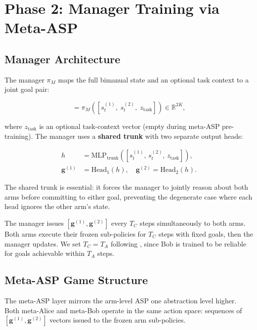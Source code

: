 \documentclass[12pt, a4paper]{article}
\newcommand{\piM}{\pi_M}
\newcommand{\goalvec}{\mathbf{g}}
\newcommand{\RR}{\mathbb{R}}
\begin{document}
\section{Phase 2: Manager Training via Meta-ASP}
\label{sec:phase2}

\subsection{Manager Architecture}
\label{subsec:manager_arch}

The manager $\piM$ maps the full bimanual state and an optional task context to a joint
goal pair:

\begin{equation}
    [\goalvec^{(1)}, \goalvec^{(2)}] = \piM\!\left([s_t^{(1)},\; s_t^{(2)},\; z_{\mathrm{task}}]\right)
    \in \RR^{2K}, \label{eq:manager_output}
\end{equation}

where $z_{\mathrm{task}}$ is an optional task-context vector (empty during meta-ASP
pre-training). The manager uses a \textbf{shared trunk} with two separate output heads:

\begin{align}
    h &= \mathrm{MLP}_{\mathrm{trunk}}\!\left([s_t^{(1)},\, s_t^{(2)},\, z_{\mathrm{task}}]\right),\\
    \goalvec^{(1)} &= \mathrm{Head}_1(h), \quad
    \goalvec^{(2)} = \mathrm{Head}_2(h).
\end{align}

The shared trunk is essential: it forces the manager to jointly reason about both arms
before committing to either goal, preventing the degenerate case where each head ignores
the other arm's state.

The manager issues $[\goalvec^{(1)}, \goalvec^{(2)}]$ every $T_C$ steps simultaneously
to both arms. Both arms execute their frozen sub-policies for $T_C$ steps with fixed goals,
then the manager updates. We set $T_C = T_A$ following \citet{sukhbaatar2018learning},
since Bob is trained to be reliable for goals achievable within $T_A$ steps.

\subsection{Meta-ASP Game Structure}
\label{subsec:meta_asp}

The meta-ASP layer mirrors the arm-level ASP one abstraction level higher. Both
meta-Alice and meta-Bob operate in the same action space: sequences of
$[\goalvec^{(1)}, \goalvec^{(2)}]$ vectors issued to the frozen arm sub-policies.
\end{document}
